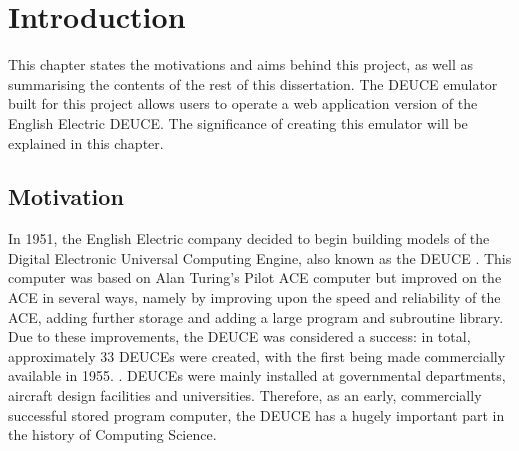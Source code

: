 \documentclass{l4proj}
\begin{document}
%
%
%
%
%
%
%
\chapter{Introduction}

This chapter states the motivations and aims behind this project, as well as summarising the
contents of the rest of this dissertation. The DEUCE emulator built for this project allows
users to operate a web application version of the English Electric DEUCE. The significance of creating
this emulator will be explained in this chapter.

\section{Motivation}

In 1951, the English Electric company decided to begin building models of the Digital Electronic Universal Computing Engine, also known as the DEUCE \citep{Vowels05}. This computer was based on Alan Turing's Pilot ACE computer but improved on the ACE in several ways, namely by improving upon the speed and reliability of the ACE, adding further storage and adding a large program and subroutine library. Due to these improvements, the DEUCE was considered a success: in total, approximately 33 DEUCEs were created, with the first being made commercially available in 1955. \citep{Vowels05}. DEUCEs were mainly installed at governmental departments, aircraft design facilities and universities. Therefore, as an early, commercially successful stored program computer, the DEUCE has a hugely important part in the history of Computing Science.
\end{document}
